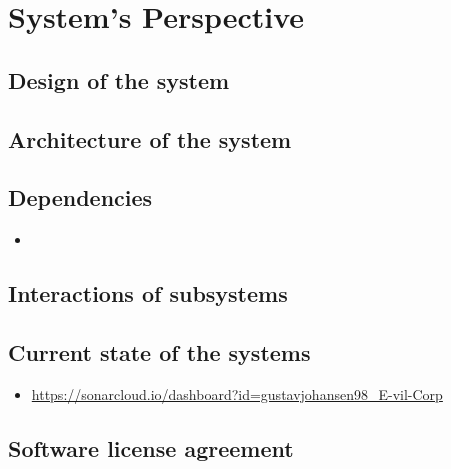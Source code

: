 \documentclass[report/main.tex]{subfiles}
\begin{document}
    \section{System's Perspective}
    \label{Sec:systems_perspective}
    
    \subsection{Design of the system}
    
    \subsection{Architecture of the system}
    
    \subsection{Dependencies}
    
    \begin{itemize}
        \item \textbf{}
    \end{itemize}
    
    \subsection{Interactions of subsystems}
    
    \subsection{Current state of the systems}
    
    \begin{itemize}
        \item \textbf{} \url{https://sonarcloud.io/dashboard?id=gustavjohansen98_E-vil-Corp}
    \end{itemize}
    
    \subsection{Software license agreement}
    

    
\end{document}
